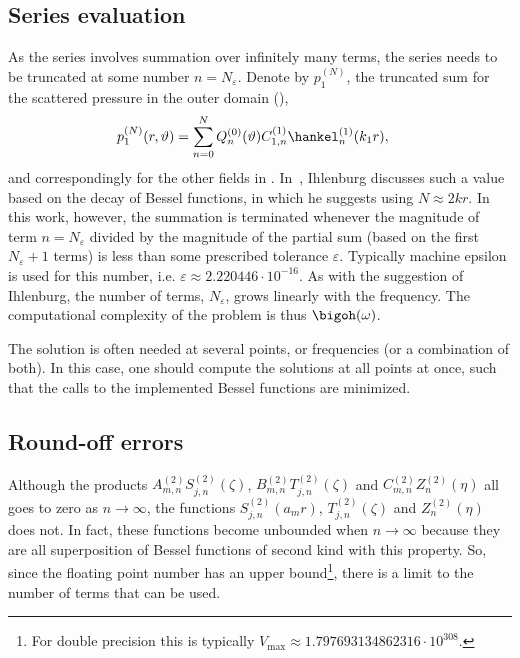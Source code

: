 \subsection{Series evaluation}
\label{Subsec1:seriesEval}
As the series involves summation over infinitely many terms, the series needs to be truncated at some number $n=N_\varepsilon$. Denote by $p_1^{(N)}$, the truncated sum for the scattered pressure in the outer domain (), 
\begin{align}\label{Eq1:truncated_p1}
p_1^{(N)}(r,\vartheta) &= \sum_{n=0}^N Q_n^{(0)}(\vartheta) C_{1,n}^{(1)} \hankel^{(1)}_n(k_1 r),
\end{align}
and correspondingly for the other fields in .
In~\cite[pp. 32-35]{Ihlenburg1998fea}, Ihlenburg discusses such a value based on the decay of Bessel functions, in which he suggests using $N\approx 2kr$. In this work, however, the summation is terminated whenever the magnitude of term $n=N_\varepsilon$ divided by the magnitude of the partial sum (based on the first $N_\varepsilon+1$ terms) is less than some prescribed tolerance $\varepsilon$. Typically machine epsilon is used for this number, i.e. $\varepsilon \approx 2.220446\cdot 10^{-16}$. As with the suggestion of Ihlenburg, the number of terms, $N_\varepsilon$, grows linearly with the frequency. The computational complexity of the problem is thus $\bigoh(\omega)$. 

The solution is often needed at several points, or frequencies (or a combination of both). In this case, one should compute the solutions at all points at once, such that the calls to the implemented Bessel functions are minimized.

\subsection{Round-off errors}
\label{Subsec1:RoundoffErrors}
Although the products $A_{m,n}^{(2)}S_{j,n}^{(2)}(\zeta)$, $B_{m,n}^{(2)}T_{j,n}^{(2)}(\zeta)$ and $C_{m,n}^{(2)}Z_n^{(2)}(\eta)$ all goes to zero as $n\to\infty$, the functions $S_{j,n}^{(2)}(a_m r)$, $T_{j,n}^{(2)}(\zeta)$ and $Z_n^{(2)}(\eta)$ does not. In fact, these functions become unbounded when $n\to\infty$ because they are all superposition of Bessel functions of second kind with this property. So, since the floating point number has an upper bound\footnote{For double precision this is typically $V_{\mathrm{max}} \approx 1.797693134862316\cdot 10^{308}$.}, there is a limit to the number of terms that can be used. 

